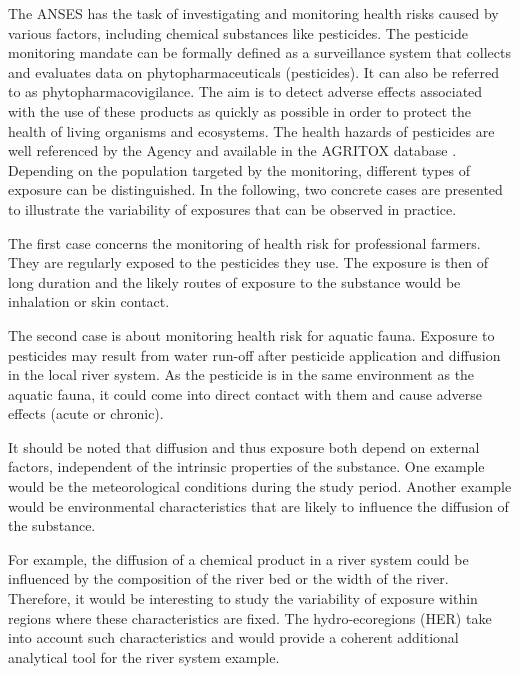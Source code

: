 The ANSES has the task of investigating and monitoring health risks caused by various factors, including chemical substances like pesticides. The pesticide monitoring mandate can be formally defined as a surveillance system that collects and evaluates data on phytopharmaceuticals (pesticides). It can also be referred to as phytopharmacovigilance. The aim is to detect adverse effects associated with the use of these products as quickly as possible in order to protect the health of living organisms and ecosystems. The health hazards of pesticides are well referenced by the Agency and available in the AGRITOX database \citep{AGRITOX}. Depending on the population targeted by the monitoring, different types of exposure can be distinguished. In the following, two concrete cases are presented to illustrate the variability of exposures that can be observed in practice. 

The first case concerns the monitoring of health risk for professional farmers. They are regularly exposed to the pesticides they use. The exposure is then of long duration and the likely routes of exposure to the substance would be inhalation or skin contact. 

The second case is about monitoring health risk for aquatic fauna. Exposure to pesticides may result from water run-off after pesticide application and diffusion in the local river system. As the pesticide is in the same environment as the aquatic fauna, it could come into direct contact with them and cause adverse effects (acute or chronic). 

It should be noted that diffusion and thus exposure both depend on external factors, independent of the intrinsic properties of the substance. One example would be the meteorological conditions during the study period. Another example would be environmental characteristics that are likely to influence the diffusion of the substance. 

For example, the diffusion of a chemical product in a river system could be influenced by the composition of the river bed or the width of the river. Therefore, it would be interesting to study the variability of exposure within regions where these characteristics are fixed. The hydro-ecoregions (HER) take into account such characteristics and would provide a coherent additional analytical tool for the river system example.           

